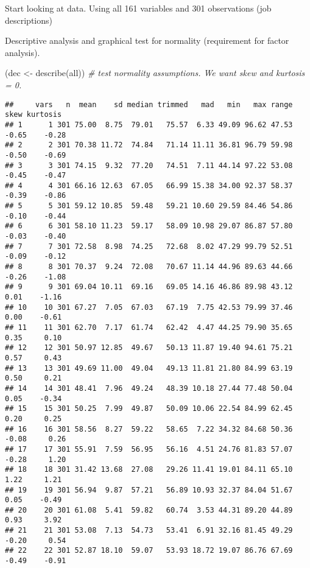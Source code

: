 \documentclass[
]{article}
\newenvironment{Shaded}{\begin{snugshade}}{\end{snugshade}}
\newcommand{\CommentTok}[1]{\textcolor[rgb]{0.56,0.35,0.01}{\textit{#1}}}
\newcommand{\FunctionTok}[1]{\textcolor[rgb]{0.00,0.00,0.00}{#1}}
\newcommand{\NormalTok}[1]{#1}
\newcommand{\OtherTok}[1]{\textcolor[rgb]{0.56,0.35,0.01}{#1}}
\begin{document}
Start looking at data. Using all 161 variables and 301 observations (job
descriptions)

Descriptive analysis and graphical test for normality (requirement for
factor analysis).

\begin{Shaded}
\begin{Highlighting}[]
\NormalTok{(dec }\OtherTok{\textless{}{-}} \FunctionTok{describe}\NormalTok{(all)) }\CommentTok{\# test normality assumptions. We want skew and kurtosis = 0. }
\end{Highlighting}
\end{Shaded}

\begin{verbatim}
##     vars   n  mean    sd median trimmed   mad   min   max range  skew kurtosis
## 1      1 301 75.00  8.75  79.01   75.57  6.33 49.09 96.62 47.53 -0.65    -0.28
## 2      2 301 70.38 11.72  74.84   71.14 11.11 36.81 96.79 59.98 -0.50    -0.69
## 3      3 301 74.15  9.32  77.20   74.51  7.11 44.14 97.22 53.08 -0.45    -0.47
## 4      4 301 66.16 12.63  67.05   66.99 15.38 34.00 92.37 58.37 -0.39    -0.86
## 5      5 301 59.12 10.85  59.48   59.21 10.60 29.59 84.46 54.86 -0.10    -0.44
## 6      6 301 58.10 11.23  59.17   58.09 10.98 29.07 86.87 57.80 -0.03    -0.40
## 7      7 301 72.58  8.98  74.25   72.68  8.02 47.29 99.79 52.51 -0.09    -0.12
## 8      8 301 70.37  9.24  72.08   70.67 11.14 44.96 89.63 44.66 -0.26    -1.08
## 9      9 301 69.04 10.11  69.16   69.05 14.16 46.86 89.98 43.12  0.01    -1.16
## 10    10 301 67.27  7.05  67.03   67.19  7.75 42.53 79.99 37.46  0.00    -0.61
## 11    11 301 62.70  7.17  61.74   62.42  4.47 44.25 79.90 35.65  0.35     0.10
## 12    12 301 50.97 12.85  49.67   50.13 11.87 19.40 94.61 75.21  0.57     0.43
## 13    13 301 49.69 11.00  49.04   49.13 11.81 21.80 84.99 63.19  0.50     0.21
## 14    14 301 48.41  7.96  49.24   48.39 10.18 27.44 77.48 50.04  0.05    -0.34
## 15    15 301 50.25  7.99  49.87   50.09 10.06 22.54 84.99 62.45  0.20     0.25
## 16    16 301 58.56  8.27  59.22   58.65  7.22 34.32 84.68 50.36 -0.08     0.26
## 17    17 301 55.91  7.59  56.95   56.16  4.51 24.76 81.83 57.07 -0.28     1.20
## 18    18 301 31.42 13.68  27.08   29.26 11.41 19.01 84.11 65.10  1.22     1.21
## 19    19 301 56.94  9.87  57.21   56.89 10.93 32.37 84.04 51.67  0.05    -0.49
## 20    20 301 61.08  5.41  59.82   60.74  3.53 44.31 89.20 44.89  0.93     3.92
## 21    21 301 53.08  7.13  54.73   53.41  6.91 32.16 81.45 49.29 -0.20     0.54
## 22    22 301 52.87 18.10  59.07   53.93 18.72 19.07 86.76 67.69 -0.49    -0.91

\end{verbatim}
\end{document}
